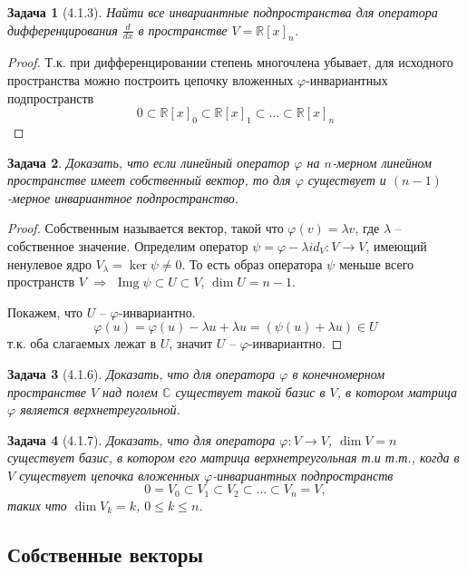 \documentclass[a4paper,12pt]{article}
\DeclareMathOperator{\img}{\mathop{Img}}
\newtheorem*{prob}{Задача}
\begin{document}
\begin{prob}[4.1.3]
	Найти все инвариантные подпространства для оператора дифференцирования $\frac{d}{dx}$ в пространстве $V = \mathbb{R}[x]_n$.
\end{prob}
\begin{proof}
	Т.к. при дифференцировании степень многочлена убывает, для исходного пространства можно построить цепочку вложенных $\varphi$-инвариантных подпространств 
	\[
		0 \subset \mathbb{R}[x]_0 \subset \mathbb{R}[x]_1 \subset \ldots \subset \mathbb{R}[x]_n
	\]
\end{proof}

\begin{prob}
	Доказать, что если линейный оператор $\varphi$ на $n$-мерном линейном пространстве имеет собственный вектор, то для $\varphi$ существует и $(n-1)$-мерное инвариантное подпространство.
\end{prob}
\begin{proof}
	Собственным называется вектор, такой что $\varphi(v) = \lambda v$, где $\lambda$ -- собственное значение. Определим оператор $\psi = \varphi - \lambda id_V : V \to V$, имеющий ненулевое ядро $V_\lambda = \ker \psi \ne 0$. То есть образ оператора $\psi$ меньше всего пространств $V$ $\Rightarrow$ $\img \psi \subset U \subset V$, $\dim U = n-1$.
	
	Покажем, что $U$ -- $\varphi$-инвариантно. 
	\[
		\varphi(u) = \varphi(u) - \lambda u + \lambda u = (\psi(u) + \lambda u) \in U
	\]
	т.к. оба слагаемых лежат в $U$, значит $U$ -- $\varphi$-инвариантно.
\end{proof}

\begin{prob}[4.1.6]
	Доказать, что для оператора $\varphi$ в конечномерном пространстве $V$ над полем $\mathbb{C}$ существует такой базис в $V$, в котором матрица $\varphi$ является верхнетреугольной.
\end{prob}

\begin{prob}[4.1.7]
	Доказать, что для оператора $\varphi: V \to V$, $\dim V = n$ существует базис, в котором его матрица верхнетреугольная т.и т.т., когда в $V$ существует цепочка вложенных $\varphi$-инвариантных подпространств
	\[
		0 = V_0 \subset V_1 \subset V_2 \subset \ldots \subset V_n = V,
	\]
	таких что $\dim V_k = k$, $0 \le k \le n$.
\end{prob}

\subsection{Собственные векторы}
\end{document}

